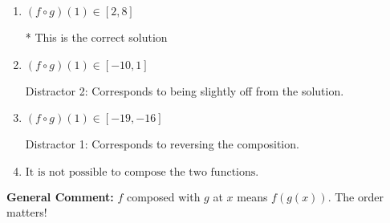 \documentclass{extbook}[14pt]
\begin{document}
\begin{enumerate}
{\begin{enumerate}[label=\Alph*.]
 Distractor 3: Corresponds to being slightly off from the solution.
\item \( (f \circ g)(1) \in [2, 8] \)

* This is the correct solution
\item \( (f \circ g)(1) \in [-10, 1] \)

 Distractor 2: Corresponds to being slightly off from the solution.
\item \( (f \circ g)(1) \in [-19, -16] \)

 Distractor 1: Corresponds to reversing the composition.
\item \( \text{It is not possible to compose the two functions.} \)


\end{enumerate}

\textbf{General Comment:} $f$ composed with $g$ at $x$ means $f(g(x))$. The order matters!
}
\end{enumerate}
\end{document}
